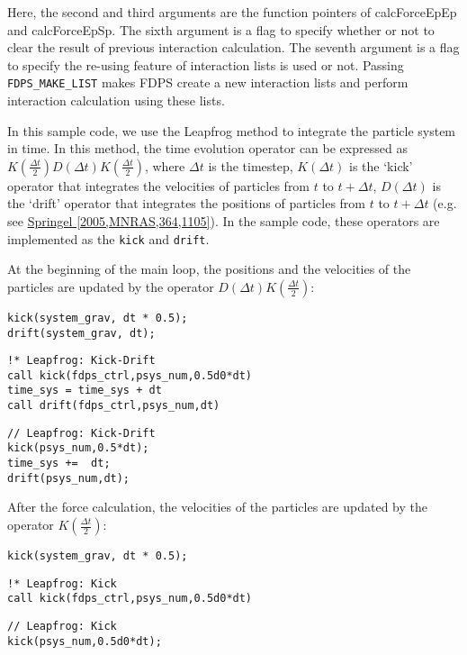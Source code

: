Here, the second and third arguments are the function pointers of \textsf{calcForceEpEp} and \textsf{calcForceEpSp}. The sixth argument is a flag to specify whether or not to clear the result of previous interaction calculation. The seventh argument is a flag to specify the re-using feature of interaction lists is used or not. Passing \texttt{FDPS\_MAKE\_LIST} makes FDPS create a new interaction lists and perform interaction calculation using these lists.
\endifC

\label{s4sec:nbody_time_integration}
In this sample code, we use the Leapfrog method to integrate the particle system in time. In this method, the time evolution operator can be expressed as $K(\frac{\Delta t}{2})D(\Delta t)K(\frac{\Delta t}{2})$, where $\Delta t$ is the timestep, $K(\Delta t)$ is the `kick' operator that integrates the velocities of particles from $t$ to $t+\Delta t$, $D(\Delta t)$ is the `drift' operator that integrates the positions of particles from $t$ to $t+\Delta t$ (e.g. see \href{http://mnras.oxfordjournals.org/content/364/4/1105}{Springel [2005,MNRAS,364,1105]}). In the sample code, these operators are implemented as the \procedures \texttt{kick} and \texttt{drift}.

At the beginning of the main loop, the positions and the velocities of the particles are updated by the operator $D(\Delta t)K(\frac{\Delta t}{2})$:

\ifCpp %
\begin{lstlisting}[caption=Calculation of $D(\Delta t)K(\frac{\Delta t}{2})$ operator]
kick(system_grav, dt * 0.5);
drift(system_grav, dt);
\end{lstlisting}
\endifCpp
\ifFtn %
\begin{lstlisting}[caption=Calculation of $D(\Delta t)K(\frac{\Delta t}{2})$operator]
!* Leapfrog: Kick-Drift
call kick(fdps_ctrl,psys_num,0.5d0*dt)
time_sys = time_sys + dt
call drift(fdps_ctrl,psys_num,dt)
\end{lstlisting}
\endifFtn
\ifFtn %
\begin{lstlisting}[caption=Calculation of $D(\Delta t)K(\frac{\Delta t}{2})$operator]
// Leapfrog: Kick-Drift
kick(psys_num,0.5*dt);
time_sys +=  dt;
drift(psys_num,dt);
\end{lstlisting}
\endifFtn


After the force calculation, the velocities of the particles are updated by the operator $K(\frac{\Delta t}{2})$:

\ifCpp %
\begin{lstlisting}[caption=Calculation of $K(\frac{\Delta t}{2})$ operator]
kick(system_grav, dt * 0.5);
\end{lstlisting}
\endifCpp
\ifFtn %
\begin{lstlisting}[caption=Calculation of $K(\frac{\Delta t}{2})$ operator]
!* Leapfrog: Kick
call kick(fdps_ctrl,psys_num,0.5d0*dt)
\end{lstlisting}
\endifFtn
\ifC %
\begin{lstlisting}[caption=Calculation of $K(\frac{\Delta t}{2})$ operator]
// Leapfrog: Kick
kick(psys_num,0.5d0*dt);
\end{lstlisting}
\endifC


